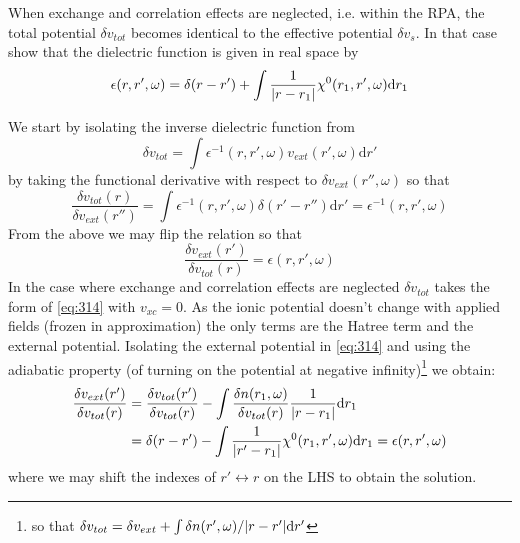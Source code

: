\begin{exercise}
When exchange and correlation effects are neglected, i.e. within the RPA, the total potential $\delta v_{tot}$ becomes identical to the effective potential $\delta v_s$. In that case show that the dielectric function is given in real space by
\begin{equation}
    \epsilon(r,r',\omega) = \delta(r-r') + \int \dfrac{1}{\abs{r-r_1}}\chi^{0}(r_1,r',\omega)\mathrm{d}r_1
\end{equation}
\end{exercise}
\begin{solution}
We start by isolating the inverse dielectric function from \begin{equation}
    \delta v_{tot} = \int\epsilon^{-1}(r,r',\omega)v_{ext}(r',\omega)\mathrm{d}r'
\end{equation}
by taking the functional derivative with respect to $\delta v_{ext}(r'',\omega)$ so that
\begin{equation}
    \dfrac{\delta v_{tot}(r)}{\delta v_{ext}(r'')} = \int\epsilon^{-1}(r,r',\omega)\delta(r'-r'')\mathrm{d}r' = \epsilon^{-1}(r,r',\omega)
\end{equation}
From the above we may flip the relation so that
\begin{equation}
    \dfrac{\delta v_{ext}(r')}{\delta v_{tot}(r)} = \epsilon(r,r',\omega)
\end{equation}
In the case where exchange and correlation effects are neglected $\delta v_{tot}$ takes the form of \eqref{eq:314} with $v_{xc} = 0$. As the ionic potential doesn't change with applied fields (frozen in approximation) the only terms are the Hatree term and the external potential. Isolating the external potential in \eqref{eq:314} and using the adiabatic property (of turning on the potential at negative infinity)\footnote{so that $\delta v_{tot} = \delta v_{ext} + \int \delta n(r',\omega)/\abs{r-r'}\mathrm{d}r'$} we obtain:
\begin{equation}
\begin{split}
    \dfrac{\delta v_{ext}(r')}{\delta v_{tot}(r)} &= \dfrac{\delta v_{tot}(r')}{\delta v_{tot}(r)} - \int \dfrac{\delta n(r_1,\omega)}{\delta v_{tot}(r)}\dfrac{1}{\abs{r-r_1}}\mathrm{d}r_1
    \\&= \delta(r-r') - \int \dfrac{1}{\abs{r'-r_1}}\chi^{0}(r_1,r',\omega)\mathrm{d}r_1 = \epsilon(r,r',\omega)
\end{split}
\end{equation}
where we may shift the indexes of $r' \leftrightarrow r$ on the LHS to obtain the solution.
\end{solution}


